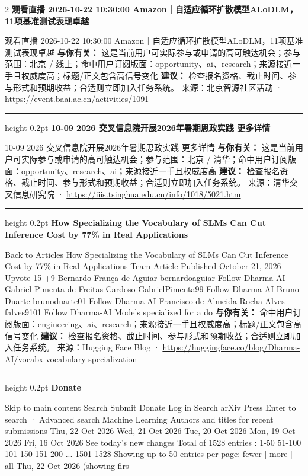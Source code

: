 \documentclass[10.5pt]{ctexart}
\begin{document}
\begin{multicols}{2}
{\large\bfseries 观看直播 2026-10-22 10:30:00 Amazon｜自适应循环扩散模型ALoDLM，11项基准测试表现卓越}\par
观看直播 2026-10-22 10:30:00 Amazon｜自适应循环扩散模型ALoDLM，11项基准测试表现卓越
\textbf{与你有关：} 这是当前用户可实际参与或申请的高可触达机会；参与范围：北京 / 线上；命中用户订阅版面：opportunity、ai、research；来源接近一手且权威度高；标题/正文包含高信号变化
\textbf{建议：} 检查报名资格、截止时间、参与形式和预期收益；合适则立即加入任务系统。
{\footnotesize\color{ormuted} 来源：北京智源社区活动 · \url{https://event.baai.ac.cn/activities/1091}}
\vspace{2mm}
\hrule height 0.2pt
\vspace{2mm}
{\large\bfseries 10-09 2026 交叉信息院开展2026年暑期思政实践 更多详情}\par
10-09 2026 交叉信息院开展2026年暑期思政实践 更多详情
\textbf{与你有关：} 这是当前用户可实际参与或申请的高可触达机会；参与范围：北京 / 清华；命中用户订阅版面：opportunity、research、ai；来源接近一手且权威度高
\textbf{建议：} 检查报名资格、截止时间、参与形式和预期收益；合适则立即加入任务系统。
{\footnotesize\color{ormuted} 来源：清华交叉信息研究院 · \url{https://iiis.tsinghua.edu.cn/info/1018/5021.htm}}
\vspace{2mm}
\hrule height 0.2pt
\vspace{2mm}
{\large\bfseries How Specializing the Vocabulary of SLMs Can Cut Inference Cost by 77\% in Real Applications}\par
Back to Articles How Specializing the Vocabulary of SLMs Can Cut Inference Cost by 77\% in Real Applications Team Article Published October 21, 2026 Upvote 15 +9 Bernardo França de Aguiar bernardoaguiar Follow Dharma-AI Gabriel Pimenta de Freitas Cardoso GabrielPimenta99 Follow Dharma-AI Bruno Duarte brunoduarte01 Follow Dharma-AI Francisco de Almeida Rocha Alves falves9101 Follow Dharma-AI Models specialized for a do
\textbf{与你有关：} 命中用户订阅版面：engineering、ai、research；来源接近一手且权威度高；标题/正文包含高信号变化
\textbf{建议：} 检查报名资格、截止时间、参与形式和预期收益；合适则立即加入任务系统。
{\footnotesize\color{ormuted} 来源：Hugging Face Blog · \url{https://huggingface.co/blog/Dharma-AI/vocabx-vocabulary-specialization}}
\vspace{2mm}
\hrule height 0.2pt
\vspace{2mm}
{\large\bfseries Donate}\par
Skip to main content Search Submit Donate Log in Search arXiv Press Enter to search · Advanced search Machine Learning Authors and titles for recent submissions Thu, 22 Oct 2026 Wed, 21 Oct 2026 Tue, 20 Oct 2026 Mon, 19 Oct 2026 Fri, 16 Oct 2026 See today's new changes Total of 1528 entries : 1-50 51-100 101-150 151-200 ... 1501-1528 Showing up to 50 entries per page: fewer | more | all Thu, 22 Oct 2026 (showing firs

\end{multicols}
\end{document}
